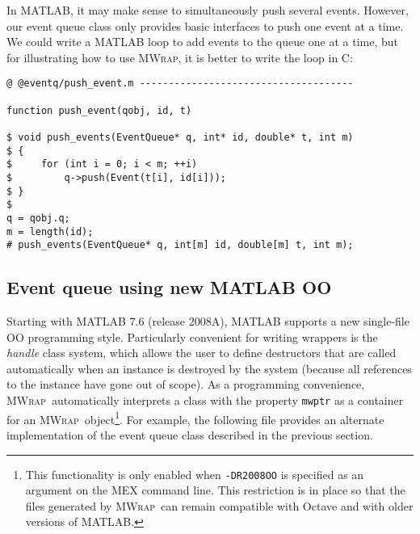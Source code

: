 \documentclass[12pt]{article}
\newcommand{\mwrap}{\textsc{MWrap}}
\begin{document}
In MATLAB, it may make sense to simultaneously push several events.
However, our event queue class only provides basic interfaces to
push one event at a time.  We could write a MATLAB loop to add events
to the queue one at a time, but for illustrating how to use \mwrap,
it is better to write the loop in C:
\begin{verbatim}
@ @eventq/push_event.m -------------------------------------

function push_event(qobj, id, t)

$ void push_events(EventQueue* q, int* id, double* t, int m)
$ {
$     for (int i = 0; i < m; ++i)
$         q->push(Event(t[i], id[i]));
$ }
$
q = qobj.q;
m = length(id);
# push_events(EventQueue* q, int[m] id, double[m] t, int m);
\end{verbatim}

\subsection{Event queue using new MATLAB OO}

Starting with MATLAB 7.6 (release 2008A), MATLAB supports a new single-file
OO programming style.  Particularly convenient for writing wrappers is the
{\em handle} class system, which allows the user to define destructors that
are called automatically when an instance is destroyed by the system (because
all references to the instance have gone out of scope).  As a programming
convenience, \mwrap\ automatically interprets a class with the property
{\tt mwptr} as a container for an \mwrap\ object\footnote{This functionality
  is only enabled when {\tt -DR2008OO} is specified as an argument on the
  MEX command line.  This restriction is in place so that the files generated
  by \mwrap\ can remain compatible with Octave and with older versions
  of MATLAB.}.  
For example, the following file provides an alternate implementation
of the event queue class described in the previous section.
\end{document}
